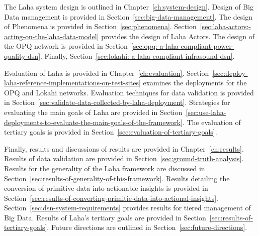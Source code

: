 The Laha system design is outlined in Chapter~\ref{ch:system-design}. Design of Big Data management is provided in Section~\ref{sec:big-data-management}. The design of Phenomena is provided in Section~\ref{sec:phenomena}. Section~\ref{sec:laha-actors:-acting-on-the-laha-data-model} provides the design of Laha Actors. The design of the OPQ network is provided in Section~\ref{sec:opq:-a-laha-compliant-power-quality-dsn}. Finally, Section~\ref{sec:lokahi:-a-laha-compliant-infrasound-dsn}.

Evaluation of Laha is provided in Chapter~\ref{ch:evaluation}. Section~\ref{sec:deploy-laha-reference-implementations-on-test-sites} examines the deployments for the OPQ and Lokahi networks. Evaluation techniques for data validation is provided in Section~\ref{sec:validate-data-collected-by-laha-deployment}. Strategies for evaluating the main goals of Laha are provided in Section~\ref{sec:use-laha-deployments-to-evaluate-the-main-goals-of-the-framework}. The evaluation of tertiary goals is provided in Section~\ref{sec:evaluation-of-tertiary-goals}.

Finally, results and discussions of results are provided in Chapter~\ref{ch:results}. Results of data validation are provided in Section~\ref{sec:ground-truth-analysis}. Results for the generality of the Laha framework are discussed in Section~\ref{sec:results-of-generality-of-this-framework}. Results detailing the conversion of primitive data into actionable insights is provided in Section~\ref{sec:results-of-converting-primitie-data-into-actional-insights}. Section~\ref{sec:dsn-system-requirements} provides results for tiered management of Big Data. Results of Laha's tertiary goals are provided in Section~\ref{sec:results-of-tertiary-goals}. Future directions are outlined in Section~\ref{sec:future-directions}.









